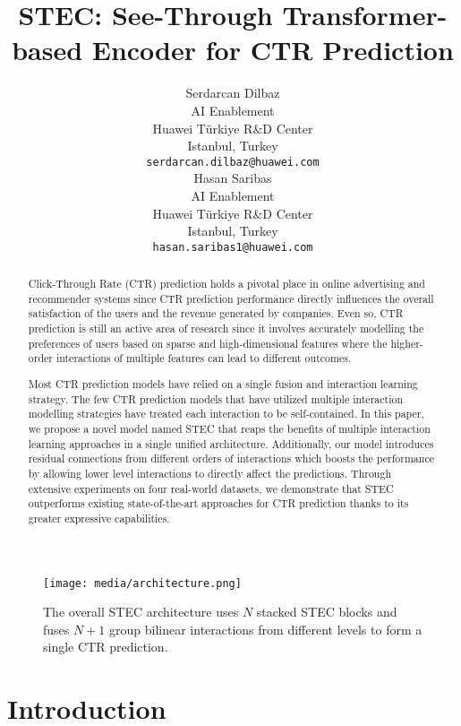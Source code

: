 \documentclass{article}
\title{STEC: See-Through Transformer-based Encoder for CTR Prediction
}
\author{
 Serdarcan Dilbaz \\
  AI Enablement\\
  Huawei Türkiye R\&D Center\\
  Istanbul, Turkey \\
  \texttt{serdarcan.dilbaz@huawei.com} \\
   \And
 Hasan Saribas \\
  AI Enablement\\
  Huawei Türkiye R\&D Center\\
  Istanbul, Turkey \\
  \texttt{hasan.saribas1@huawei.com}
}
\begin{document}
\maketitle

\begin{abstract}
Click-Through Rate (CTR) prediction holds a pivotal place in online advertising and recommender systems since CTR prediction performance directly influences the overall satisfaction of the users and the revenue generated by companies. Even so, CTR prediction is still an active area of research since it involves accurately modelling the preferences of users based on sparse and high-dimensional features where the higher-order interactions of multiple features can lead to different outcomes.

Most CTR prediction models have relied on a single fusion and interaction learning strategy. The few CTR prediction models that have utilized multiple interaction modelling strategies have treated each interaction to be self-contained. In this paper, we propose a novel model named STEC that reaps the benefits of multiple interaction learning approaches in a single unified architecture. Additionally, our model introduces residual connections from different orders of interactions which boosts the performance by allowing lower level interactions to directly affect the predictions. Through extensive experiments on four real-world datasets, we demonstrate that STEC outperforms existing state-of-the-art approaches for CTR prediction thanks to its greater expressive capabilities.
\end{abstract}


\begin{figure}[t]
\centering
\texttt{[image: media/architecture.png]}
\caption{The overall STEC architecture uses $N$ stacked STEC blocks and fuses $N+1$ group bilinear interactions from different levels to form a single CTR prediction.}
\label{fig:architecture}
\end{figure}


\section{Introduction}
\end{document}
